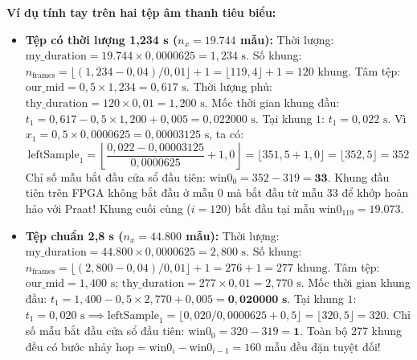 \textbf{Ví dụ tính tay trên hai tệp âm thanh tiêu biểu:}
\begin{itemize}[leftmargin=1.5em, itemsep=3pt]
    \item \textbf{Tệp có thời lượng 1,234 s ($n_x = 19.744$ mẫu):}
    Thời lượng: $\text{my\_duration} = 19.744 \times 0{,}0000625 = 1{,}234\text{ s}$.
    Số khung: $n_{\text{frames}} = \lfloor (1{,}234 - 0{,}04) / 0{,}01 \rfloor + 1 = \lfloor 119{,}4 \rfloor + 1 = 120\text{ khung}$.
    Tâm tệp: $\text{our\_mid} = 0{,}5 \times 1{,}234 = 0{,}617\text{ s}$.
    Thời lượng phủ: $\text{thy\_duration} = 120 \times 0{,}01 = 1{,}200\text{ s}$.
    Mốc thời gian khung đầu: $t_1 = 0{,}617 - 0{,}5 \times 1{,}200 + 0{,}005 = 0{,}022000\text{ s}$.
    Tại khung $1$: $t_1 = 0{,}022\text{ s}$. Vì $x_1 = 0{,}5 \times 0{,}0000625 = 0{,}00003125\text{ s}$, ta có:
    \begin{equation}
    \text{leftSample}_1 = \left\lfloor \frac{0{,}022 - 0{,}00003125}{0{,}0000625} + 1{,}0 \right\rfloor = \lfloor 351{,}5 + 1{,}0 \rfloor = \lfloor 352{,}5 \rfloor = 352
    \end{equation}
    Chỉ số mẫu bắt đầu cửa sổ đầu tiên: $\text{win0}_0 = 352 - 319 = \mathbf{33}$.
    Khung đầu tiên trên FPGA không bắt đầu ở mẫu 0 mà bắt đầu từ mẫu 33 để khớp hoàn hảo với Praat! Khung cuối cùng ($i=120$) bắt đầu tại mẫu $\text{win0}_{119} = 19.073$.
    
    \item \textbf{Tệp chuẩn 2,8 s ($n_x = 44.800$ mẫu):}
    Thời lượng: $\text{my\_duration} = 44.800 \times 0{,}0000625 = 2{,}800\text{ s}$.
    Số khung: $n_{\text{frames}} = \lfloor (2{,}800 - 0{,}04) / 0{,}01 \rfloor + 1 = 276 + 1 = 277\text{ khung}$.
    Tâm tệp: $\text{our\_mid} = 1{,}400\text{ s}$; $\text{thy\_duration} = 277 \times 0{,}01 = 2{,}770\text{ s}$.
    Mốc thời gian khung đầu: $t_1 = 1{,}400 - 0{,}5 \times 2{,}770 + 0{,}005 = \mathbf{0{,}020000\text{ s}}$.
    Tại khung $1$: $t_1 = 0{,}020\text{ s} \implies \text{leftSample}_1 = \lfloor 0{,}020 / 0{,}0000625 + 0{,}5 \rfloor = \lfloor 320{,}5 \rfloor = 320$.
    Chỉ số mẫu bắt đầu cửa sổ đầu tiên: $\text{win0}_0 = 320 - 319 = \mathbf{1}$.
    Toàn bộ 277 khung đều có bước nhảy $\text{hop} = \text{win0}_i - \text{win0}_{i-1} = 160$ mẫu đều đặn tuyệt đối!
\end{itemize}


